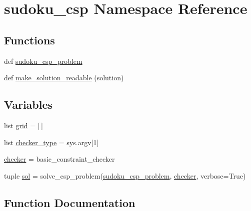 \hypertarget{namespacesudoku__csp}{}\section{sudoku\+\_\+csp Namespace Reference}
\label{namespacesudoku__csp}
\subsection*{Functions}
\begin{DoxyCompactItemize}
\item 
def \hyperlink{namespacesudoku__csp_a9c87cb782dcce61a05568a53d019d51f}{sudoku\+\_\+csp\+\_\+problem}
\item 
def \hyperlink{namespacesudoku__csp_a84ad26f446cf7a130bead59f8f7d6599}{make\+\_\+solution\+\_\+readable} (solution)
\end{DoxyCompactItemize}
\subsection*{Variables}
\begin{DoxyCompactItemize}
\item 
list \hyperlink{namespacesudoku__csp_a96041389ba3daa8e9ab1671a86b8ee5e}{grid} = \mbox{[}$\,$\mbox{]}
\item 
list \hyperlink{namespacesudoku__csp_a6c548c4a9e4e6fdcde28afb99e3d1ac1}{checker\+\_\+type} = sys.\+argv\mbox{[}1\mbox{]}
\item 
\hyperlink{namespacesudoku__csp_a652884ff1b0cd3e66f36cf015c8b1d89}{checker} = basic\+\_\+constraint\+\_\+checker
\item 
tuple \hyperlink{namespacesudoku__csp_ad63795a911d014e95721a1018f8dde6e}{sol} = solve\+\_\+csp\+\_\+problem(\hyperlink{namespacesudoku__csp_a9c87cb782dcce61a05568a53d019d51f}{sudoku\+\_\+csp\+\_\+problem}, \hyperlink{namespacesudoku__csp_a652884ff1b0cd3e66f36cf015c8b1d89}{checker}, verbose=True)
\end{DoxyCompactItemize}


\subsection{Function Documentation}
\hypertarget{namespacesudoku__csp_a84ad26f446cf7a130bead59f8f7d6599}{}
